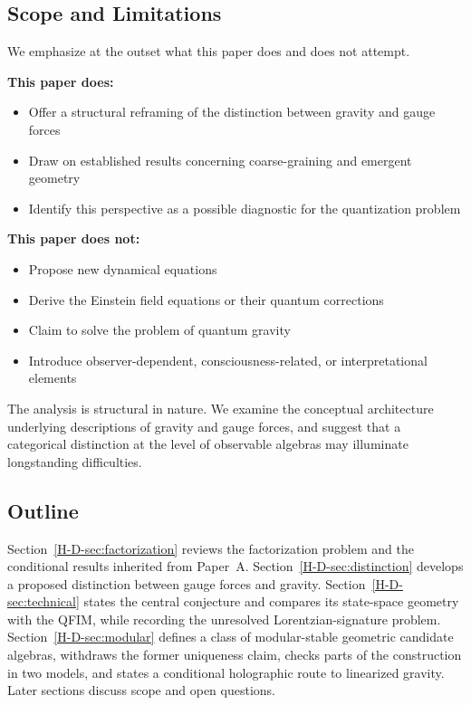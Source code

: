 \documentclass[12pt,a4paper,openany]{book}
\begin{document}
\subsection{Scope and Limitations}

We emphasize at the outset what this paper does and does not attempt.

\textbf{This paper does:}
\begin{itemize}
    \item Offer a structural reframing of the distinction between gravity and gauge forces
    \item Draw on established results concerning coarse-graining and emergent geometry
    \item Identify this perspective as a possible diagnostic for the quantization problem
\end{itemize}

\textbf{This paper does not:}
\begin{itemize}
    \item Propose new dynamical equations
    \item Derive the Einstein field equations or their quantum corrections
    \item Claim to solve the problem of quantum gravity
    \item Introduce observer-dependent, consciousness-related, or interpretational elements
\end{itemize}

The analysis is structural in nature. We examine the conceptual architecture underlying descriptions of gravity and gauge forces, and suggest that a categorical distinction at the level of observable algebras may illuminate longstanding difficulties.

\subsection{Outline}

Section~\ref{H-D-sec:factorization} reviews the factorization problem and the conditional results inherited from Paper~A. Section~\ref{H-D-sec:distinction} develops a proposed distinction between gauge forces and gravity. Section~\ref{H-D-sec:technical} states the central conjecture and compares its state-space geometry with the QFIM, while recording the unresolved Lorentzian-signature problem. Section~\ref{H-D-sec:modular} defines a class of modular-stable geometric candidate algebras, withdraws the former uniqueness claim, checks parts of the construction in two models, and states a conditional holographic route to linearized gravity. Later sections discuss scope and open questions.
\end{document}
